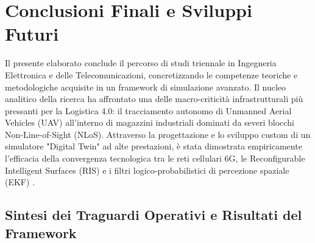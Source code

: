 \documentclass[twoside]{article}
\begin{document}
\clearpage

\clearpage
\section{Conclusioni Finali e Sviluppi Futuri}

Il presente elaborato conclude il percorso di studi triennale in Ingegneria Elettronica e delle Telecomunicazioni, concretizzando le competenze teoriche e metodologiche acquisite in un framework di simulazione avanzato. Il nucleo analitico della ricerca ha affrontato una delle macro-criticità infrastrutturali più pressanti per la Logistica 4.0: il tracciamento autonomo di Unmanned Aerial Vehicles (UAV) all'interno di magazzini industriali dominati da severi blocchi Non-Line-of-Sight (NLoS).
Attraverso la progettazione e lo sviluppo custom di un simulatore "Digital Twin" ad alte prestazioni, è stata dimostrata empiricamente l'efficacia della convergenza tecnologica tra le reti cellulari 6G, le Reconfigurable Intelligent Surfaces (RIS) e i filtri logico-probabilistici di percezione spaziale (EKF) \cite{Muller2024,Ye2023}.

\subsection{Sintesi dei Traguardi Operativi e Risultati del Framework}
\end{document}
